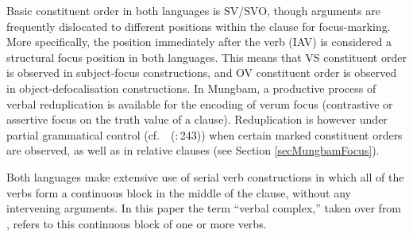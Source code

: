 \documentclass[10pt,twoside]{article}
\newcommand{\citepage}[2]{\citeauthor{#1}~{(\citeyear{#1}:\,{#2})}}
\newcommand{\sref}[1]{Section \ref{#1}}
\begin{document}

Basic constituent
order in both languages is SV/SVO, though arguments are frequently dislocated
to different positions within the clause for focus-marking.
More specifically, the position immediately after the verb (IAV) is
considered a structural
focus position in both languages. This means that VS constituent
order is observed in subject-focus constructions, and OV constituent
order is observed in object-defocalisation constructions.
In Mungbam, a productive process of verbal reduplication
is available for the encoding of verum focus (contrastive
or assertive focus on the truth value of a clause).
Reduplication is however under partial grammatical control (cf.~\citepage{hyman:1984}{243})
when certain marked constituent orders are observed, as
well as in relative clauses (see
\sref{secMungbamFocus}).

Both languages make extensive use of serial verb constructions
in which all of the verbs form a continuous block
in the middle of the clause, without any intervening arguments.
In this paper the term ``verbal complex,'' taken over
from \cite{kiessling:2011},
refers to this
continuous block of one or more verbs.
\end{document}
